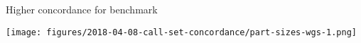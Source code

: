 \documentclass{beamer}
\begin{document}
\begin{frame}{Higher concordance for benchmark}

\texttt{[image: figures/2018-04-08-call-set-concordance/part-sizes-wgs-1.png]}
\end{frame}


\begin{columns}[t]
\begin{column}{0.5\textwidth}

\end{column}

\begin{column}{0.5\textwidth}

\end{column}
\end{columns}
\end{document}
